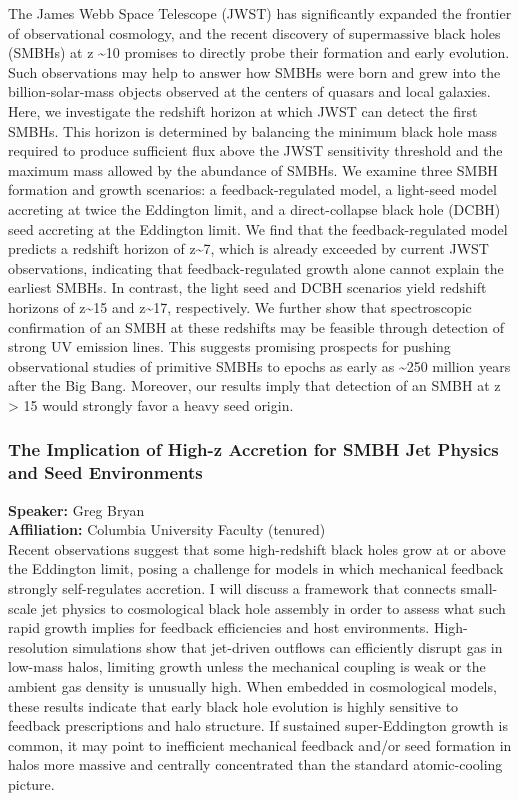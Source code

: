The James Webb Space Telescope (JWST) has significantly expanded the frontier of observational cosmology, and the recent discovery of supermassive black holes (SMBHs) at z \textasciitilde{}10 promises to directly probe their formation and early evolution. Such observations may help to answer how SMBHs were born and grew into the billion-solar-mass objects observed at the centers of quasars and local galaxies. Here, we investigate the redshift horizon at which JWST can detect the first SMBHs. This horizon is determined by balancing the minimum black hole mass required to produce sufficient flux above the JWST sensitivity threshold and the maximum mass allowed by the abundance of SMBHs. We examine three SMBH formation and growth scenarios: a feedback-regulated model, a light-seed model accreting at twice the Eddington limit, and a direct-collapse black hole (DCBH) seed accreting at the Eddington limit.
 We find that the feedback-regulated model predicts a redshift horizon of z\textasciitilde{}7, which is already exceeded by current JWST observations, indicating that feedback-regulated growth alone cannot explain the earliest SMBHs. In contrast, the light seed and DCBH scenarios yield redshift horizons of z\textasciitilde{}15 and z\textasciitilde{}17, respectively. We further show that spectroscopic confirmation of an SMBH at these redshifts may be feasible through detection of strong UV emission lines. This suggests promising prospects for pushing observational studies of primitive SMBHs to epochs as early as \textasciitilde{}250 million years after the Big Bang. Moreover, our results imply that detection of an SMBH at z > 15 would strongly favor a heavy seed origin.

\hypertarget{abs-66}{}
\subsubsection*{The Implication of High-z Accretion for SMBH Jet Physics and Seed Environments}
\textbf{Speaker:} Greg Bryan \\
\textbf{Affiliation:} Columbia University \textperiodcentered{} Faculty (tenured)\\
Recent observations suggest that some high-redshift black holes grow at or above the Eddington limit, posing a challenge for models in which mechanical feedback strongly self-regulates accretion. I will discuss a framework that connects small-scale jet physics to cosmological black hole assembly in order to assess what such rapid growth implies for feedback efficiencies and host environments. High-resolution simulations show that jet-driven outflows can efficiently disrupt gas in low-mass halos, limiting growth unless the mechanical coupling is weak or the ambient gas density is unusually high. When embedded in cosmological models, these results indicate that early black hole evolution is highly sensitive to feedback prescriptions and halo structure. If sustained super-Eddington growth is common, it may point to inefficient mechanical feedback and/or seed formation in halos more massive and centrally concentrated than the standard atomic-cooling picture.


